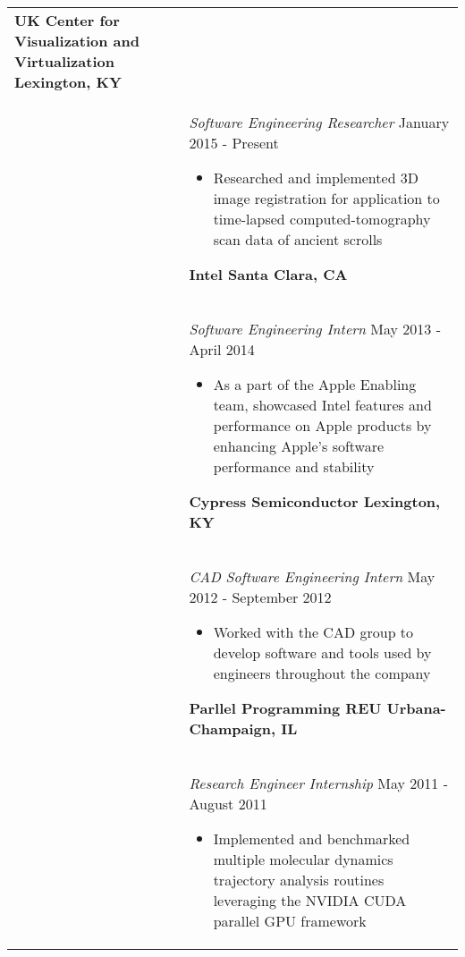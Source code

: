 \documentclass[11pt]{article}
\begin{document}
\begin{tabular}{p{0.75in} p{5.45in}}
        \textbf{UK Center for Visualization and Virtualization \hfill Lexington, KY} \vspace{0.015in} \\ &
        {\textit{Software Engineering Researcher} \hfill January 2015 - Present} \vspace{0.02in}
        \begin{itemize}
            \renewcommand{\labelitemi}{$\diamond$}
            \item Researched and implemented 3D image registration for application to \linebreak time-lapsed computed-tomography scan data of ancient scrolls
        \end{itemize} \vspace{0.09in}

        \textbf{Intel \hfill Santa Clara, CA} \vspace{0.015in} \\ &
        {\textit{Software Engineering Intern} \hfill May 2013 - April 2014} \vspace{0.02in}
        \begin{itemize}
            \renewcommand{\labelitemi}{$\diamond$}
            \item As a part of the Apple Enabling team, showcased Intel features and performance on Apple products by enhancing Apple's software performance and stability
        \end{itemize} \vspace{0.09in}

        \textbf{Cypress Semiconductor \hfill Lexington, KY} \vspace{0.015in} \\ &
        {\textit{CAD Software Engineering Intern} \hfill May 2012 - September 2012} \vspace{0.02in}
        \begin{itemize}
            \renewcommand{\labelitemi}{$\diamond$}
            \item Worked with the CAD group to develop software and tools used by engineers throughout the company
        \end{itemize} \vspace{0.09in}

        \textbf{Parllel Programming REU \hfill Urbana-Champaign, IL} \vspace{0.015in} \\ &
        {\textit{Research Engineer Internship} \hfill May 2011 - August 2011} \vspace{0.02in}
        \begin{itemize}
            \renewcommand{\labelitemi}{$\diamond$}
            \item Implemented and benchmarked multiple molecular dynamics trajectory analysis routines leveraging the NVIDIA CUDA parallel GPU framework 
        \end{itemize} \\


\end{tabular}
\end{document}
